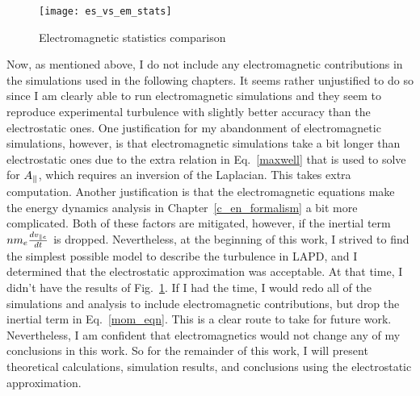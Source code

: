 \begin{figure}
\texttt{[image: es\_vs\_em\_stats]}
\centering
\caption{Electromagnetic statistics comparison}
\label{es_vs_em_stats}
\end{figure}

Now, as mentioned above, I do not include any electromagnetic contributions in the simulations used in the following chapters. 
It seems rather unjustified to do so since I am clearly able to run electromagnetic simulations and they seem to reproduce experimental turbulence with slightly better accuracy 
than the electrostatic ones.
One justification for my abandonment of electromagnetic simulations, however, is that electromagnetic simulations take a bit longer than electrostatic ones due to the extra relation in Eq.~\ref{maxwell} 
that is used to solve for $A_\parallel$, which requires an inversion of the Laplacian. This takes extra computation. 
Another justification is that the electromagnetic equations make the energy dynamics analysis in Chapter~\ref{c_en_formalism} a bit more complicated. Both of these factors are mitigated, 
however, if the inertial term $n m_e \frac{dv_{\parallel e}}{dt}$ is dropped. Nevertheless, at the beginning of this work, I strived to find the simplest possible model to describe the turbulence in LAPD,
and I determined that the electrostatic approximation was acceptable. At that time, I didn't have the results of Fig.~\ref{es_vs_em_stats}. If I had the time, I would redo all of the simulations
and analysis to include electromagnetic contributions, but drop the inertial term in Eq.~\ref{mom_eqn}. This is a clear route to take for future work. 
Nevertheless, I am confident that electromagnetics would not change any of my conclusions in this work.
So for the remainder of this work, I will present theoretical calculations, simulation results, and conclusions using the electrostatic approximation.
